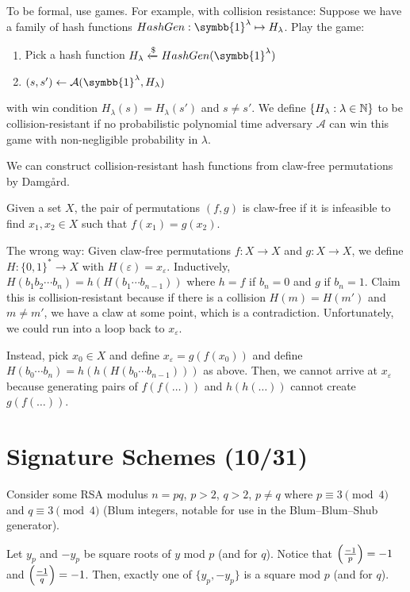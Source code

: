 \documentclass[notes]{agony}
\newcommand{\xgets}{\xleftarrow}
\newcommand{\ndgets}{\xgets{\mathdollar}}
\newcommand{\one}{\symbb{1}}
\newcommand{\leg}[2]{\qty(\frac{#1}{#2})}
\begin{document}
To be formal, use games.
For example, with collision resistance:
Suppose we have a family of hash functions $HashGen : \one^\lambda \mapsto H_\lambda$.
Play the game:
\begin{enumerate}[1.]
  \item Pick a hash function $H_\lambda \ndgets HashGen(\one^\lambda)$
  \item $(s, s') \gets \mathcal A(\one^\lambda, H_\lambda)$
\end{enumerate}
with win condition $H_\lambda(s) = H_\lambda(s')$ and $s \neq s'$.
We define $\{H_\lambda : \lambda \in \mathbb{N}\}$
to be collision-resistant if no probabilistic polynomial time adversary $\mathcal A$
can win this game with non-negligible probability in $\lambda$.

We can construct collision-resistant hash functions
from claw-free permutations by Damg\aa{}rd.

\begin{defn}
  Given a set $X$, the pair of permutations $(f,g)$ is claw-free if
  it is infeasible to find $x_1,x_2 \in X$ such that $f(x_1) = g(x_2)$.
\end{defn}

The wrong way:
Given claw-free permutations $f : X \to X$ and $g : X \to X$,
we define $H : \{0,1\}^* \to X$ with $H(\varepsilon) = x_\varepsilon$.
Inductively, $H(b_1b_2\cdots b_n) = h(H(b_1\cdots b_{n-1}))$
where $h = f$ if $b_n = 0$ and $g$ if $b_n = 1$.
Claim this is collision-resistant because if there is a collision
$H(m) = H(m')$ and $m \neq m'$, we have a claw at some point,
which is a contradiction.
Unfortunately, we could run into a loop back to $x_\varepsilon$.

Instead, pick $x_0 \in X$ and define $x_\varepsilon = g(f(x_0))$
and define $H(b_0\cdots b_n) = h(h(H(b_0 \cdots b_{n-1})))$ as above.
Then, we cannot arrive at $x_\varepsilon$
because generating pairs of $f(f(\dots))$ and $h(h(\dots))$ cannot create $g(f(\dots))$.

\section{Signature Schemes (10/31)}

Consider some RSA modulus $n = pq$, $p > 2$, $q > 2$, $p \neq q$
where $p \equiv 3 \pmod 4$ and $q \equiv 3 \pmod 4$ (Blum integers,
notable for use in the Blum--Blum--Shub generator).

Let $y_p$ and $-y_p$ be square roots of $y$ mod $p$ (and for $q$).
Notice that $\leg{-1}{p} = -1$ and $\leg{-1}{q} = -1$.
Then, exactly one of $\{y_p,-y_p\}$ is a square mod $p$ (and for $q$).
\end{document}
